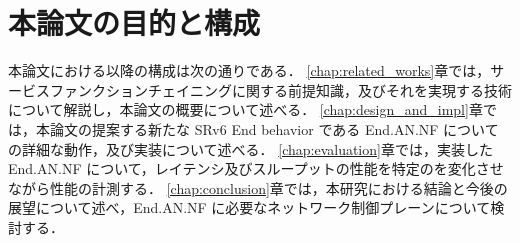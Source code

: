 \section{本論文の目的と構成}
本論文における以降の構成は次の通りである．
\ref*{chap:related_works}章では，サービスファンクションチェイニングに関する前提知識，及びそれを実現する技術について解説し，本論文の概要について述べる．
\ref*{chap:design_and_impl}章では，本論文の提案する新たな SRv6 End behavior である End.AN.NF についての詳細な動作，及び実装について述べる．
\ref*{chap:evaluation}章では，実装した End.AN.NF について，レイテンシ及びスループットの性能を特定のを変化させながら性能の計測する．
\ref*{chap:conclusion}章では，本研究における結論と今後の展望について述べ，End.AN.NF に必要なネットワーク制御プレーンについて検討する．